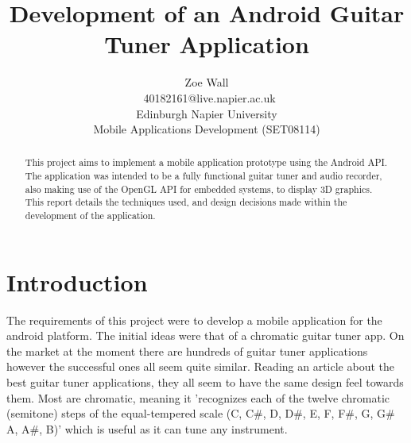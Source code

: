 \documentclass[conference]{acmsiggraph}
\title{Development of an Android Guitar Tuner Application}
\author{Zoe Wall \\\ 40182161@live.napier.ac.uk \\
Edinburgh Napier University \\
Mobile Applications Development (SET08114)}
\newcommand{\figuremacroW}[4]{
	\begin{figure}[H] %
		\centering
		\texttt{[image: \#1]}
		\caption[#2]{\textbf{#2} - #3}
		\label{fig:#1}
	\end{figure}
}
\begin{document}

\maketitle

\begin{abstract} %
This project aims to implement a mobile application prototype using the Android API. The application was intended to be a fully functional guitar tuner and audio recorder, also making use of the OpenGL API for embedded systems, to display 3D graphics. This report details the techniques used, and design decisions made within the development of the application.
\end{abstract}

\keywordlist




\section{Introduction}

The requirements of this project were to develop a mobile application for the android platform. The initial ideas were that of a chromatic guitar tuner app. On the market at the moment there are hundreds of guitar tuner applications however the successful ones all seem quite similar. Reading an article about the best guitar tuner applications, they all seem to have the same design feel towards them. \cite{bestApps} Most are chromatic, meaning it 'recognizes each of the twelve chromatic (semitone) steps of the equal-tempered scale (C, C\#, D, D\#, E, F, F\#, G, G\# A, A\#, B)' which is useful as it can tune any instrument. \cite{Roland}
\end{document}
